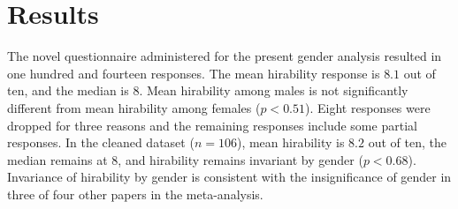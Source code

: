 \documentclass[review]{elsarticle}
\begin{document}


\section{Results}

The novel questionnaire administered for the present gender analysis resulted in one hundred and fourteen responses.
The mean hirability response is $8.1$ out of ten, and the median is $8$.
Mean hirability among males is not significantly different from mean hirability among females ($p < 0.51$).
Eight responses were dropped for three reasons and the remaining responses include some partial responses.
In the cleaned dataset ($n = 106$), mean hirability is $8.2$ out of ten,
the median remains at $8$, and hirability remains invariant by gender ($p < 0.68$).
Invariance of hirability by gender is consistent with the insignificance of gender in three of four other papers in the meta-analysis.
\end{document}
